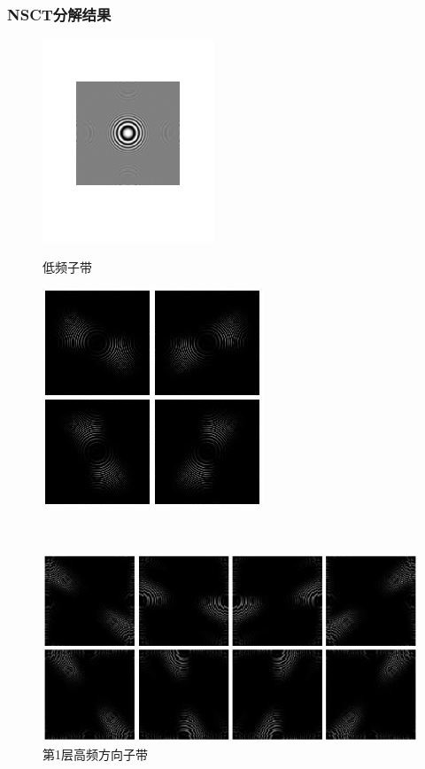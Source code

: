 \documentclass[10pt,aspectratio=43,mathserif]{beamer}
\begin{document}
		\begin{frame}
		  \frametitle{\textbf{NSCT分解结果}}
            \begin{figure}[ht] %
	\centering
	\begin{minipage}[t]{0.4\linewidth}%
		\centering
		\includegraphics[width=0.6\linewidth]{./figures/nsct/NSCT_de_a.png}

		\caption{低频子带}
		\label{fig:NSCT_de_a}
	\end{minipage}%
	\begin{minipage}[t]{0.4\linewidth}
		\centering
		\includegraphics[width=0.6\linewidth]{./figures/nsct/NSCT_de_b.png}

		\caption{第1层高频方向子带}
		\label{fig:NSCT_de_b}
	\end{minipage}
	\\
	\begin{minipage}[t]{0.7\linewidth}
		\centering
		\includegraphics[width=0.7\linewidth]{./figures/nsct/NSCT_de_c.png}


\end{minipage}
\end{figure}
\end{frame}
\end{document}
